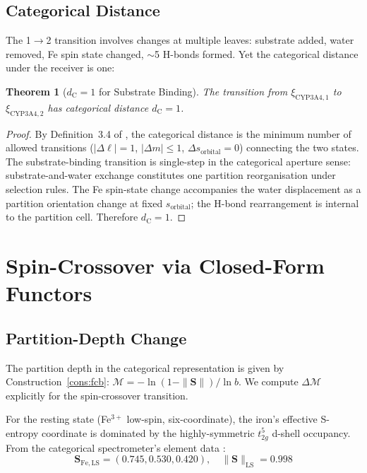 \documentclass[11pt,twocolumn,a4paper]{article}
\newtheorem{theorem}{Theorem}[section]
\theoremstyle{definition}
\theoremstyle{remark}
\newcommand{\Scoord}{\mathbf{S}}
\newcommand{\Sexp}{\xi}
\newcommand{\depth}{\mathcal{M}}
\newcommand{\dC}{d_{\mathrm{C}}}
\begin{document}
\subsection{Categorical Distance}

The 1$\to$2 transition involves changes at multiple leaves: substrate added, water removed, Fe spin state changed, $\sim$5 H-bonds formed. Yet the categorical distance under the receiver is one:

\begin{theorem}[$\dC = 1$ for Substrate Binding]
\label{thm:dc_one}
The transition from $\Sexp_{\mathrm{CYP3A4,1}}$ to $\Sexp_{\mathrm{CYP3A4,2}}$ has categorical distance $\dC = 1$.
\end{theorem}

\begin{proof}
By Definition~3.4 of \citep{sachikonye2025_charge}, the categorical distance is the minimum number of allowed transitions ($|\Delta\ell|=1$, $|\Delta m|\leq 1$, $\Delta s_{\mathrm{orbital}}=0$) connecting the two states. The substrate-binding transition is single-step in the categorical aperture sense: substrate-and-water exchange constitutes one partition reorganisation under selection rules. The Fe spin-state change accompanies the water displacement as a partition orientation change at fixed $s_{\mathrm{orbital}}$; the H-bond rearrangement is internal to the partition cell. Therefore $\dC = 1$.
\end{proof}

\section{Spin-Crossover via Closed-Form Functors}
\label{sec:spin_crossover}

\subsection{Partition-Depth Change}

The partition depth in the categorical representation is given by Construction~\ref{cons:fcb}: $\depth = -\ln(1 - \|\Scoord\|)/\ln b$. We compute $\Delta\depth$ explicitly for the spin-crossover transition.

For the resting state (Fe$^{3+}$ low-spin, six-coordinate), the iron's effective S-entropy coordinate is dominated by the highly-symmetric $t_{2g}^5$ d-shell occupancy. From the categorical spectrometer's element data \citep{sachikonye2025_paper1}:
\begin{equation}
\Scoord_{\mathrm{Fe,LS}} = (0.745, 0.530, 0.420),
\quad \|\Scoord\|_{\mathrm{LS}} = 0.998
\end{equation}
\end{document}
